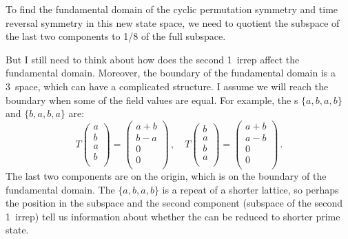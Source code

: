 \begin{description}
To find the fundamental domain of the cyclic permutation symmetry and time reversal symmetry
in this new state space, we need to quotient the subspace of the last two components to 1/8 of
the full subspace.

But I still need to think about how does the second 1\dmn\ irrep affect the fundamental domain.
Moreover, the boundary of the fundamental domain is a 3\dmn\ space, which can have a
complicated structure. I assume we will reach the boundary when some of the field values
are equal. For example, the {\lattstate}s $\{a, b, a, b\}$ and $\{b, a, b, a\}$ are:
\[
T
\left(
\begin{array}{c}
 a \\
 b \\
 a \\
 b \\
\end{array}
\right)
=
\left(
\begin{array}{c}
 a+b \\
 b-a \\
 0 \\
 0 \\
\end{array}
\right) \,,
\quad
T
\left(
\begin{array}{c}
 b \\
 a \\
 b \\
 a \\
\end{array}
\right)
=
\left(
\begin{array}{c}
 a+b \\
 a-b \\
 0 \\
 0 \\
\end{array}
\right) \,.
\]
The last two components are on the origin, which is on the boundary of the fundamental domain. The
{\lattstate} $\{a, b, a, b\}$ is a repeat of a shorter lattice, so perhaps the position in the subspace
and the second component (subspace of the second 1\dmn\ irrep) tell us information about whether
the {\lattstate} can be reduced to shorter prime state.


\end{description}
